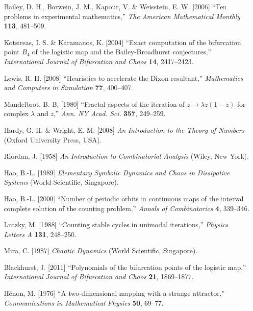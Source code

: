 \documentclass{ws-ijbc}
\begin{document}
\begin{thebibliography}{50}
  Bailey, D. H., Borwein, J. M., Kapour, V. \& Weisstein, E. W. [2006]
  ``Ten problems in experimental mathematics,''
  {\it The American Mathematical Monthly}
  \textbf{113},
  481--509.

  Kotsireas, I. S. \& Karamanos, K. [2004]
  ``Exact computation of the bifurcation point $B_4$ of the logistic map
  and  the Bailey-Broadhurst conjectures,''
  {\it International Journal of Bifurcation and Chaos}
  \textbf{14},
  2417--2423.

  Lewis, R. H. [2008]
  ``Heuristics to accelerate the Dixon resultant,''
  {\it Mathematics and Computers in Simulation}
  \textbf{77},
  400--407.

  Mandelbrot, B. B. [1980]
  ``Fractal aspects of the iteration of $z \rightarrow \lambda z(1-z)$
      for complex $\lambda$ and $z$,''
  {\it Ann. NY Acad. Sci.}
  \textbf{357},
  249--259.

  Hardy, G. H. \& Wright, E. M. [2008]
  {\it An Introduction to the Theory of Numbers}
  (Oxford University Press, USA).

  Riordan, J. [1958]
  {\it An Introduction to Combinatorial Analysis}
  (Wiley, New York).

  Hao, B.-L. [1989]
  {\it Elementary Symbolic Dynamics and Chaos in  Dissipative Systems}
  (World Scientific, Singapore).

  Hao, B.-L. [2000]
  ``Number of periodic orbits in continuous maps of
  the interval complete solution of the counting problem,''
  {\it Annals of Combinatorics}
  \textbf{4},
  339--346.

  Lutzky, M. [1988]
  ``Counting stable cycles in unimodal iterations,''
  {\it Physics Letters A}
  \textbf{131},
  248--250.

  Mira, C. [1987]
  {\it Chaotic Dynamics}
  (World Scientific, Singapore).

  Blackhurst, J. [2011]
  ``Polynomials of the bifurcation points of the logistic map,''
  {\it International Journal of Bifurcation and Chaos}
  \textbf{21},
  1869--1877.

  H\'enon, M. [1976]
  ``A two-dimensional mapping with a strange attractor,''
  {\it Communications in Mathematical Physics}
  \textbf{50},
  69--77.


\end{thebibliography}
\end{document}
